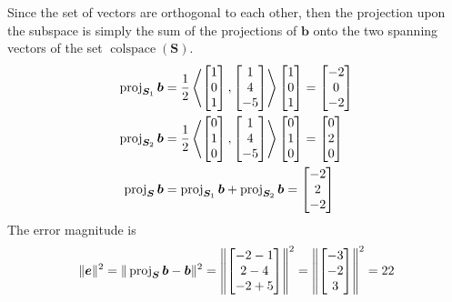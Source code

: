 \documentclass[]{article}
\renewcommand{\vec}[1]{\bm{#1}}
\newcommand{\proj}[1]{\operatorname{proj} #1}
\newcommand{\iprod}[2]{\left\langle #1, #2 \right\rangle}
\begin{document}
Since the set of vectors are orthogonal to each other, then the projection upon the subspace is simply the sum of the projections of \(\vec{b}\) onto the two spanning vectors of the set \(\operatorname{colspace}(\vec{S})\).  
\begin{align}
	\proj_{\vec{S}_1}{\vec{b}} &= \frac{1}{2}\iprod{\begin{bmatrix}
		1 \\
		0 \\
		1
		\end{bmatrix}}{\begin{bmatrix}
		1 \\
		4 \\
		-5
		\end{bmatrix}} 
		\begin{bmatrix}
		1 \\
		0 \\
		1
		\end{bmatrix} = \begin{bmatrix}
		-2 \\
		0 \\
		-2
		\end{bmatrix} \\
		\proj_{\vec{S}_2}{\vec{b}} &= \frac{1}{2}\iprod{\begin{bmatrix}
		0 \\
		1 \\
		0
		\end{bmatrix}}{\begin{bmatrix}
		1 \\
		4 \\
		-5
		\end{bmatrix}} 
		\begin{bmatrix}
		0 \\
		1 \\
		0
		\end{bmatrix} = \begin{bmatrix}
		0 \\
		2 \\
		0
		\end{bmatrix} \\
		\proj_{\vec{S}}{\vec{b}} &= \proj_{\vec{S}_1}{\vec{b}} + \proj_{\vec{S}_2}{\vec{b}} = \begin{bmatrix}
		-2 \\
		2 \\
		-2
		\end{bmatrix}
\end{align}
The error magnitude is 
\begin{equation}
	\|\vec{e}\|^2 = \|\proj_{\vec{S}}{\vec{b}} - \vec{b}\|^2 = \left\|\begin{bmatrix}
	-2 - 1 \\
	2 - 4 \\
	-2 + 5
	\end{bmatrix}\right\|^2 = \left\|\begin{bmatrix}
	-3 \\
	-2 \\
	3
	\end{bmatrix}\right\|^2 = 22
\end{equation}
\end{document}
